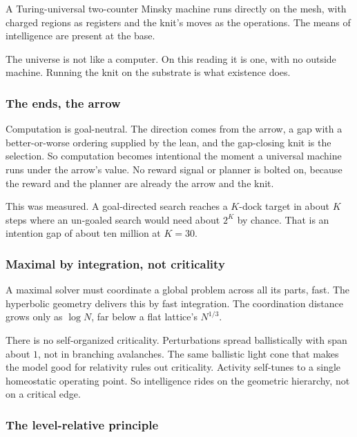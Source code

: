 \begin{result}
A Turing-universal two-counter Minsky machine runs directly on the mesh, with charged regions as registers and the knit's moves as the operations. The means of intelligence are present at the base.
\end{result}

\begin{principle}
The universe is not like a computer. On this reading it is one, with no outside machine. Running the knit on the substrate is what existence does.
\end{principle}

\subsubsection{The ends, the arrow}

Computation is goal-neutral. The direction comes from the arrow, a gap with a better-or-worse ordering supplied by the lean, and the gap-closing knit is the selection. So computation becomes intentional the moment a universal machine runs under the arrow's value. No reward signal or planner is bolted on, because the reward and the planner are already the arrow and the knit.

This was measured. A goal-directed search reaches a $K$-dock target in about $K$ steps where an un-goaled search would need about $2^K$ by chance. That is an intention gap of about ten million at $K = 30$.

\subsubsection{Maximal by integration, not criticality}

A maximal solver must coordinate a global problem across all its parts, fast. The hyperbolic geometry delivers this by fast integration. The coordination distance grows only as $\log N$, far below a flat lattice's $N^{1/3}$.

There is no self-organized criticality. Perturbations spread ballistically with span about $1$, not in branching avalanches. The same ballistic light cone that makes the model good for relativity rules out criticality. Activity self-tunes to a single homeostatic operating point. So intelligence rides on the geometric hierarchy, not on a critical edge.

\subsubsection{The level-relative principle}

